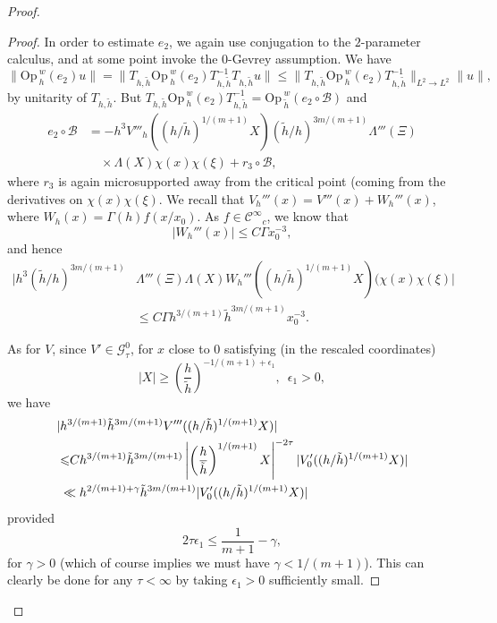 \documentclass[twoside, final]{amsart}
\theoremstyle{definition}
\numberwithin{equation}{section}
\begin{document}
\begin{proof}
\begin{proof}
In order to estimate $e_2$, we again use conjugation to
the $2$-parameter calculus, and at some point invoke the 0-Gevrey assumption.  We have
\[
\| {\mathrm{Op}\,}_h^w(e_2) u \| = \| T_{h, {\tilde{h}}} {\mathrm{Op}\,}_h^w(e_2) T_{h, {\tilde{h}}}^{-1}
T_{h, {\tilde{h}}} u \| {\leqslant} \| T_{h, {\tilde{h}}} {\mathrm{Op}\,}_h^w(e_2) T_{h, {\tilde{h}}}^{-1}
\|_{L^2 \to L^2} \| u \|,
\]
by unitarity of $T_{h, {\tilde{h}}}$.  But $T_{h, {\tilde{h}}} {\mathrm{Op}\,}_h^w(e_2) T_{h,
  {\tilde{h}}}^{-1} = {\mathrm{Op}\,}_{\tilde{h}}^w(e_2 \circ {\mathcal{B}} )$ and
\begin{align*}
e_2 \circ {\mathcal{B}} & =  -h^3 V'''_h((h/{\tilde{h}})^{1/(m+1)}X) ({\tilde{h}}/h)^{3m/(m+1)} \Lambda'''
(\Xi) \\
& \quad \times \Lambda(X) \chi(x)
\chi(\xi) + r_3 \circ {\mathcal{B}}  ,
\end{align*}
where $r_3$ is again microsupported away from the critical point
(coming from the derivatives on $\chi(x) \chi(\xi)$.  
We recall that $V_h'''(x) = V'''(x) + W_h'''(x)$, where $W_h(x) =
\Gamma(h) f(x/x_0)$.  As $f \in {{\mathcal C}^\infty}_c$, we know that 
\[
|W_h'''(x)| {\leqslant} C \Gamma x_0^{-3},
\]
and hence
\begin{align*}
| h^3 ({\tilde{h}}/h)^{3m/(m+1)} & \Lambda'''
(\Xi) \Lambda(X) W_h''' ((h/{\tilde{h}})^{1/(m+1)}X)  (\chi(x)
\chi(\xi) | \\
& {\leqslant} C \Gamma h^{3/(m+1)} {\tilde{h}}^{3m/(m+1)} x_0^{-3}.
\end{align*}

As for $V$, since $V' \in {\mathcal{G}}^0_\tau$, for $x$ close to $0$
satisfying (in the rescaled coordinates)
\[
| X | {\geqslant} \left( \frac{h}{\tilde{h}} \right)^{-1/(m+1) + \epsilon_1}, \,\,\,
\epsilon_1 >0, 
\]
we have
\begin{align}
| &h^{3/(m+1)} {\tilde{h}}^{3m/(m+1)}  V'''((h/{\tilde{h}})^{1/(m+1)} X ) | \label{E:V-3-der}\\
& {\leqslant} C h^{3/(m+1)} {\tilde{h}}^{3m/(m+1)} 
\left| \left( \frac{h}{\tilde{h}} \right)^{1/(m+1)} X \right|^{-2 \tau} | V_0'
((h/{\tilde{h}})^{1/(m+1)} X ) | \notag \\
& \ll h^{2/(m+1) + \gamma} {\tilde{h}}^{3m/(m+1)} |  V_0'
((h/{\tilde{h}})^{1/(m+1)} X ) | \notag
\end{align}
provided
\[
2 \tau \epsilon_1 {\leqslant} \frac{1}{m+1} - \gamma,
\]
for $\gamma>0$ (which of course implies we must have $\gamma <
1/(m+1)$).  
This can clearly be done for any $\tau < \infty$ by taking
$\epsilon_1>0$ sufficiently small.


\end{proof}
\end{proof}
\end{document}
